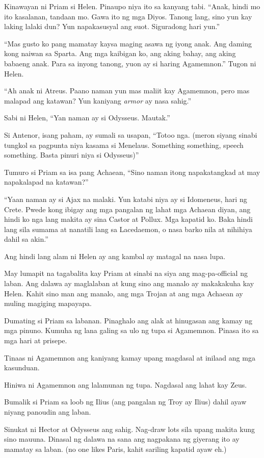 \documentclass[12pt,letterpaper]{report}
\begin{document}
Kinawayan ni Priam si Helen. Pinaupo niya ito sa kanyang tabi. ``Anak, hindi mo ito kasalanan, tandaan mo. Gawa ito ng mga Diyos. Tanong lang, sino yun kay laking lalaki dun? Yun napakasusyal ang suot. Siguradong hari yun.''

``Mas gusto ko pang mamatay kaysa maging asawa ng iyong anak. Ang daming kong naiwan sa Sparta. Ang mga kaibigan ko, ang aking bahay, ang aking babaeng anak. Para sa inyong tanong, yuon ay si haring Agamemnon.'' Tugon ni Helen.

``Ah anak ni Atreus. Paano naman yun mas maliit kay Agamemnon, pero mas malapad ang katawan? Yun kaniyang \textit{armor} ay nasa sahig.''

Sabi ni Helen, ``Yan naman ay si Odysseus. Mautak.''

Si Antenor, isang paham, ay sumali sa usapan, ``Totoo nga. (meron siyang sinabi tungkol sa pagpunta niya kasama si Menelaus. Something something, speech something. Basta pinuri niya si Odysseus)''

Tumuro si Priam sa isa pang Achaean, ``Sino naman itong napakatangkad at may napakalapad na katawan?''

``Yaan naman ay si Ajax na malaki. Yun katabi niya ay si Idomeneus, hari ng Crete. Pwede kong ibigay ang mga pangalan ng lahat mga Achaean diyan, ang hindi ko nga lang makita ay sina Castor at Pollux. Mga kapatid ko. Baka hindi lang sila sumama at nanatili lang sa Lacedaemon, o nasa barko nila at nihihiya dahil sa akin.''

Ang hindi lang alam ni Helen ay ang kambal ay matagal na nasa lupa.

May lumapit na tagabalita kay Priam at sinabi na siya ang mag-pa-official ng laban. Ang dalawa ay maglalaban at kung sino ang manalo ay makakakuha kay Helen. Kahit sino man ang manalo, ang mga Trojan at ang mga Achaean ay muling magiging mapayapa.

Dumating si Priam sa labanan. Pinaghalo ang alak at hinugasan ang kamay ng mga pinuno. Kumuha ng lana galing sa ulo ng tupa si Agamemnon. Pinasa ito sa mga hari at prisepe.

Tinaas ni Agamemnon ang kaniyang kamay upang magdasal at inilaad ang mga kasunduan.

Hiniwa ni Agamemnon ang lalamunan ng tupa. Nagdasal ang lahat kay Zeus.

Bumalik si Priam sa loob ng Ilius (ang pangalan ng Troy ay Ilius) dahil ayaw niyang panoudin ang laban.

Sinukat ni Hector at Odysseus ang sahig. Nag-draw lots sila upang makita kung sino mauuna. Dinasal ng dalawa na sana ang nagpakana ng giyerang ito ay mamatay sa laban. (no one likes Paris, kahit sariling kapatid ayaw eh.)
\end{document}
